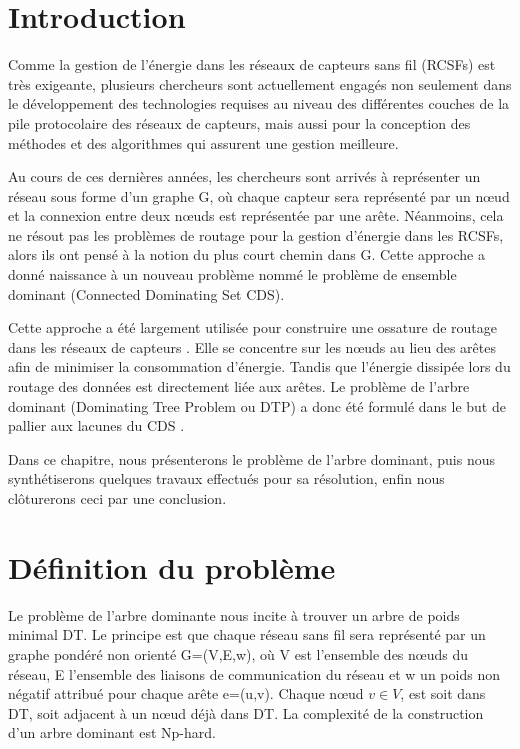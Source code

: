 


\section{Introduction}
Comme la gestion de l’énergie dans les réseaux de capteurs sans fil (RCSFs) est très exigeante, plusieurs chercheurs sont actuellement engagés non seulement dans le développement des technologies requises au niveau des différentes couches de la pile protocolaire des réseaux de capteurs, mais aussi pour la conception des méthodes et des algorithmes qui assurent une gestion meilleure.

Au cours de ces dernières années, les chercheurs sont arrivés à représenter un réseau sous forme d’un graphe G, où chaque capteur sera représenté par un nœud et la connexion entre deux nœuds est représentée par une arête. Néanmoins, cela ne résout pas  les problèmes de routage pour la gestion d’énergie dans les RCSFs, alors ils ont pensé à la notion du plus court chemin dans G.  Cette approche a donné naissance à un nouveau problème nommé le problème de ensemble dominant (Connected Dominating Set CDS).

Cette approche a été largement utilisée pour construire une ossature de routage dans les réseaux de capteurs \cite{thai2008construction,thai2007connected}. Elle se concentre sur les nœuds au lieu des arêtes afin de minimiser la consommation d’énergie. Tandis que l’énergie dissipée lors du routage des données est directement liée aux arêtes.
Le problème de l’arbre dominant (Dominating Tree Problem ou DTP) a donc été formulé dans le but de pallier aux lacunes du CDS \cite{shin2010approximation,zhang2008new} .

Dans ce chapitre, nous présenterons le problème de l’arbre dominant, puis nous synthétiserons quelques travaux effectués pour sa résolution, enfin nous clôturerons ceci par une conclusion.


\section{Définition du problème}
Le problème de l’arbre dominante nous incite à trouver un arbre de poids minimal DT. Le principe est que chaque réseau sans fil sera représenté par un graphe pondéré non orienté G=(V,E,w), où V est l’ensemble des nœuds du réseau, E l’ensemble des liaisons de communication du réseau et w un poids non négatif attribué pour chaque arête e=(u,v). Chaque nœud $v \in V$, est soit dans DT, soit adjacent à un nœud déjà dans DT. La complexité de la construction d’un arbre dominant est Np-hard.
 
